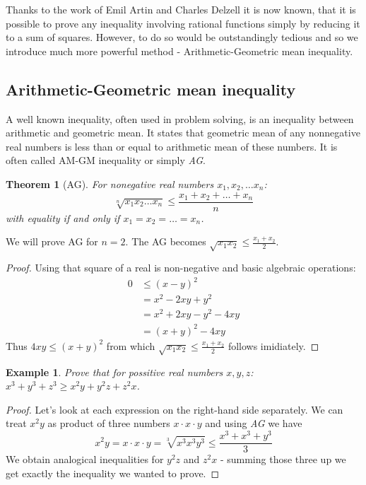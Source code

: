 \documentclass[11pt,a5paper]{article}
\newtheorem{theorem}{Example}
\newtheorem*{Theorem}{Theorem}
\begin{document}
\noindent Thanks to the work of Emil Artin and Charles Delzell 
it is now known, that it is possible to prove any inequality 
involving rational functions simply by reducing it to a sum of 
squares. However, to do so would be outstandingly tedious and 
so we introduce much more powerful method - Arithmetic-Geometric 
mean inequality.

\subsection*{Arithmetic-Geometric mean inequality}

A well known inequality, often used in problem solving, is an 
inequality between arithmetic and geometric mean. It states that geometric mean of any nonnegative real numbers is less than or equal to arithmetic mean of these numbers. It is often 
called AM-GM inequality or simply \emph{AG}.

\begin{Theorem}[AG]
For nonegative real numbers $x_1, x_2, \dots x_n$: 
\[\sqrt[n]{x_1x_2\dots x_n} \le  \frac{x_1 + x_2 + \dots + x_n}{n}\] 
with equality if and only if $x_1 = x_2 = \dots = x_n$. \\
\end{Theorem}

\noindent We will prove AG for $n=2$. The AG becomes 
$\sqrt{x_1x_2} \le  \frac{x_1 + x_2}{2}$. 
\begin{proof} Using that square of a real is non-negative and basic 
algebraic operations:
	\begin{align*}
	0 & \le (x-y)^2 \\
	 & = x^2 - 2xy + y^2 \\
	 & = x^2 + 2xy - y^2 -4xy \\
	 & = (x+y)^2 - 4xy 
	\end{align*}
	Thus $4xy \le (x+y)^2$ from which 
	$\sqrt{x_1x_2} \le  \frac{x_1 + x_2}{2}$ follows imidiately. 
\end{proof}

\begin{theorem}
	Prove that for possitive real numbers $x, y, z$: 
	$x^3 + y^3 + z^3 \ge x^2y + y^2z + z^2x$.
\end{theorem}

\begin{proof} Let's look at each expression on the right-hand side 
separately. We can treat $x^2y$ as product of three numbers 
$x\cdot x\cdot y$ and using \emph{AG} we have 
\[x^2y = x\cdot x\cdot y = \sqrt[3]{x^3x^3y^3} \le\frac{x^3 + x^3 + y^3}{3}\]
We obtain analogical inequalities for $y^2z$ and $z^2x$ - summing 
those three up we get exactly the inequality we wanted to prove.
\end{proof}
\end{document}
